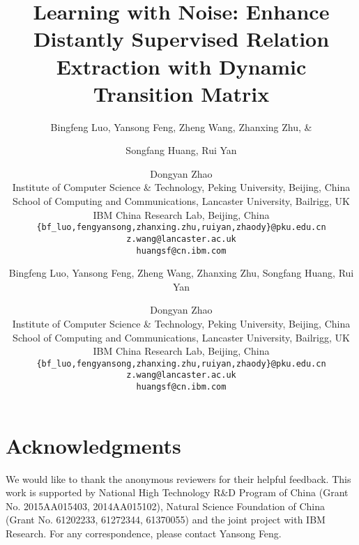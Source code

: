 \documentclass[11pt,a4paper]{article}
\title{Learning with Noise: Enhance Distantly Supervised Relation Extraction with Dynamic Transition Matrix\vspace{-10mm}}
\author{Bingfeng Luo, Yansong Feng, Zheng Wang, Zhanxing Zhu, \&
\and
Songfang Huang, Rui Yan \and Dongyan Zhao \\
  Institute of Computer Science \& Technology, Peking University, Beijing, China \\
  School of Computing and Communications, Lancaster University, Bailrigg, UK \\
  IBM China Research Lab, Beijing, China \\
  {\tt \{bf\_luo,fengyansong,zhanxing.zhu,ruiyan,zhaody\}@pku.edu.cn} \\
  {\tt z.wang@lancaster.ac.uk} \\
  {\tt huangsf@cn.ibm.com} \\}
\author{Bingfeng Luo, Yansong Feng, Zheng Wang, Zhanxing Zhu, 
Songfang Huang, Rui Yan \and Dongyan Zhao \\
  Institute of Computer Science \& Technology, Peking University, Beijing, China \\
  School of Computing and Communications, Lancaster University, Bailrigg, UK \\
  IBM China Research Lab, Beijing, China \\
  {\tt \{bf\_luo,fengyansong,zhanxing.zhu,ruiyan,zhaody\}@pku.edu.cn} \\
  {\tt z.wang@lancaster.ac.uk} \\
  {\tt huangsf@cn.ibm.com} \\}
\begin{document}
\maketitle




%







\section*{Acknowledgments}
We would like to thank the anonymous reviewers for their helpful
feedback. This work is supported by National High Technology R\&D Program of China (Grant
No. 2015AA015403, 2014AA015102), Natural Science Foundation of China (Grant No. 61202233,
61272344, 61370055) and the joint project with IBM Research. For any correspondence, please contact
Yansong Feng. 

\clearpage


\end{document}

